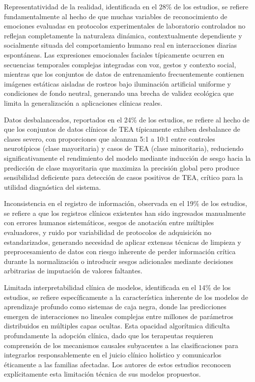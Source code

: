 \documentclass{ieeeaccess}
\begin{document}
	Representatividad de la realidad, identificada en el 28\% de los estudios, se refiere fundamentalmente al hecho de que muchas variables de reconocimiento de emociones evaluadas en protocolos experimentales de laboratorio controlados no reflejan completamente la naturaleza dinámica, contextualmente dependiente y socialmente situada del comportamiento humano real en interacciones diarias espontáneas. Las expresiones emocionales faciales típicamente ocurren en secuencias temporales complejas integradas con voz, gestos y contexto social, mientras que los conjuntos de datos de entrenamiento frecuentemente contienen imágenes estáticas aisladas de rostros bajo iluminación artificial uniforme y condiciones de fondo neutral, generando una brecha de validez ecológica que limita la generalización a aplicaciones clínicas reales.
	
	Datos desbalanceados, reportados en el 24\% de los estudios, se refiere al hecho de que los conjuntos de datos clínicos de TEA típicamente exhiben desbalance de clases severo, con proporciones que alcanzan 5:1 a 10:1 entre controles neurotípicos (clase mayoritaria) y casos de TEA (clase minoritaria), reduciendo significativamente el rendimiento del modelo mediante inducción de sesgo hacia la predicción de clase mayoritaria que maximiza la precisión global pero produce sensibilidad deficiente para detección de casos positivos de TEA, crítico para la utilidad diagnóstica del sistema.
	
	Inconsistencia en el registro de información, observada en el 19\% de los estudios, se refiere a que los registros clínicos existentes han sido ingresados manualmente con errores humanos sistemáticos, sesgos de anotación entre múltiples evaluadores, y ruido por variabilidad de protocolos de adquisición no estandarizados, generando necesidad de aplicar extensas técnicas de limpieza y preprocesamiento de datos con riesgo inherente de perder información crítica durante la normalización o introducir sesgos adicionales mediante decisiones arbitrarias de imputación de valores faltantes.
	
	Limitada interpretabilidad clínica de modelos, identificada en el 14\% de los estudios, se refiere específicamente a la característica inherente de los modelos de aprendizaje profundo como sistemas de caja negra, donde las predicciones emergen de interacciones no lineales complejas entre millones de parámetros distribuidos en múltiples capas ocultas. Esta opacidad algorítmica dificulta profundamente la adopción clínica, dado que los terapeutas requieren comprensión de los mecanismos causales subyacentes a las clasificaciones para integrarlos responsablemente en el juicio clínico holístico y comunicarlos éticamente a las familias afectadas. Los autores de estos estudios reconocen explícitamente esta limitación técnica de sus modelos propuestos.
	
\end{document}
